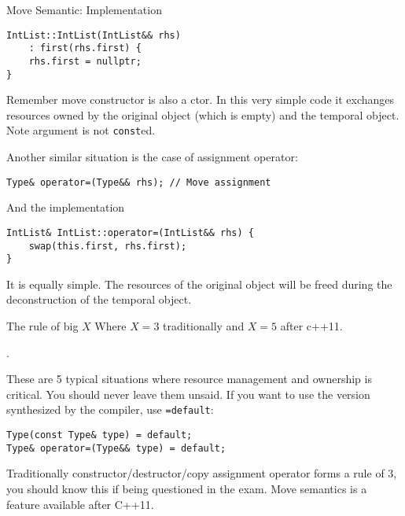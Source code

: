 \begin{frame}[fragile]{Move Semantic: Implementation}
\begin{verbatim}
IntList::IntList(IntList&& rhs)
    : first(rhs.first) {
    rhs.first = nullptr;
}
\end{verbatim}
Remember move constructor is also a ctor. In this very simple code it exchanges resources owned by the original object (which is empty) and the temporal object. Note argument is not \texttt{const}ed.

Another similar situation is the case of assignment operator:
\begin{verbatim}
Type& operator=(Type&& rhs); // Move assignment
\end{verbatim}
And the implementation
\begin{verbatim}
IntList& IntList::operator=(IntList&& rhs) {
	swap(this.first, rhs.first);
}
\end{verbatim}
It is equally simple. The resources of the original object will be freed during the deconstruction of the temporal object.
\end{frame}

\begin{frame}[fragile]{The rule of big $X$}
Where $X = 3$ traditionally and $X=5$ after c++11.
\begin{center}
	.
\end{center}
These are 5 typical situations where resource management and ownership is critical. You should never leave them unsaid. If you want to use the version synthesized by the compiler, use \texttt{=default}:
\begin{verbatim}
Type(const Type& type) = default;
Type& operator=(Type&& type) = default;
\end{verbatim}
Traditionally constructor/destructor/copy assignment operator forms a rule of 3, you should know this if being questioned in the exam. Move semantics is a feature available after C++11. 
\end{frame}

